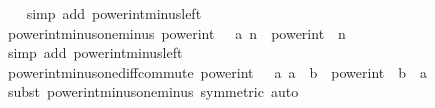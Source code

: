 \begin{isabellebody}
%
\isadelimproof
\ \ %
\endisadelimproof
%
\isatagproof
{}\isamarkupfalse%
\ {\isacharparenleft}{\kern0pt}simp\ add{\isacharcolon}{\kern0pt}\ power{\isacharunderscore}{\kern0pt}int{\isacharunderscore}{\kern0pt}minus{\isacharunderscore}{\kern0pt}left{\isacharparenright}{\kern0pt}%
\endisatagproof
{\isafoldproof}%
%
\isadelimproof
\isanewline
%
\endisadelimproof
\isanewline
{}\isamarkupfalse%
\ power{\isacharunderscore}{\kern0pt}int{\isacharunderscore}{\kern0pt}minus{\isacharunderscore}{\kern0pt}one{\isacharunderscore}{\kern0pt}minus{\isacharcolon}{\kern0pt}\ {\isachardoublequoteopen}power{\isacharunderscore}{\kern0pt}int\ {\isacharparenleft}{\kern0pt}{\isacharminus}{\kern0pt}{}\ {\isacharcolon}{\kern0pt}{\isacharcolon}{\kern0pt}\ {\isacharprime}{\kern0pt}a{\isacharparenright}{\kern0pt}\ {\isacharparenleft}{\kern0pt}{\isacharminus}{\kern0pt}n{\isacharparenright}{\kern0pt}\ {\isacharequal}{\kern0pt}\ power{\isacharunderscore}{\kern0pt}int\ {\isacharparenleft}{\kern0pt}{\isacharminus}{\kern0pt}{}{\isacharparenright}{\kern0pt}\ n{\isachardoublequoteclose}\isanewline
%
\isadelimproof
\ \ %
\endisadelimproof
%
\isatagproof
{}\isamarkupfalse%
\ {\isacharparenleft}{\kern0pt}simp\ add{\isacharcolon}{\kern0pt}\ power{\isacharunderscore}{\kern0pt}int{\isacharunderscore}{\kern0pt}minus{\isacharunderscore}{\kern0pt}left{\isacharparenright}{\kern0pt}%
\endisatagproof
{\isafoldproof}%
%
\isadelimproof
\isanewline
%
\endisadelimproof
\isanewline
{}\isamarkupfalse%
\ power{\isacharunderscore}{\kern0pt}int{\isacharunderscore}{\kern0pt}minus{\isacharunderscore}{\kern0pt}one{\isacharunderscore}{\kern0pt}diff{\isacharunderscore}{\kern0pt}commute{\isacharcolon}{\kern0pt}\ {\isachardoublequoteopen}power{\isacharunderscore}{\kern0pt}int\ {\isacharparenleft}{\kern0pt}{\isacharminus}{\kern0pt}{}\ {\isacharcolon}{\kern0pt}{\isacharcolon}{\kern0pt}\ {\isacharprime}{\kern0pt}a{\isacharparenright}{\kern0pt}\ {\isacharparenleft}{\kern0pt}a\ {\isacharminus}{\kern0pt}\ b{\isacharparenright}{\kern0pt}\ {\isacharequal}{\kern0pt}\ power{\isacharunderscore}{\kern0pt}int\ {\isacharparenleft}{\kern0pt}{\isacharminus}{\kern0pt}{}{\isacharparenright}{\kern0pt}\ {\isacharparenleft}{\kern0pt}b\ {\isacharminus}{\kern0pt}\ a{\isacharparenright}{\kern0pt}{\isachardoublequoteclose}\isanewline
%
\isadelimproof
\ \ %
\endisadelimproof
%
\isatagproof
{}\isamarkupfalse%
\ {\isacharparenleft}{\kern0pt}subst\ power{\isacharunderscore}{\kern0pt}int{\isacharunderscore}{\kern0pt}minus{\isacharunderscore}{\kern0pt}one{\isacharunderscore}{\kern0pt}minus\ {\isacharbrackleft}{\kern0pt}symmetric{\isacharbrackright}{\kern0pt}{\isacharparenright}{\kern0pt}\ auto%

\end{isabellebody}
